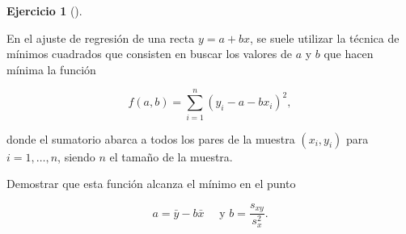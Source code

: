 \documentclass[
  a4paper,
]{scrreport}
\theoremstyle{definition}
\newtheorem{exercise}{Ejercicio}[chapter]
\theoremstyle{remark}
\begin{document}
\begin{exercise}[]\protect\hypertarget{exr-ajuste-minimos-cuadrados}{}\label{exr-ajuste-minimos-cuadrados}

En el ajuste de regresión de una recta \(y=a+bx\), se suele utilizar la
técnica de mínimos cuadrados que consisten en buscar los valores de
\(a\) y \(b\) que hacen mínima la función

\[
f(a,b)= \sum_{i=1}^{n}(y_i-a-bx_i)^2,
\]

donde el sumatorio abarca a todos los pares de la muestra \((x_i,y_i)\)
para \(i=1,\ldots, n\), siendo \(n\) el tamaño de la muestra.

Demostrar que esta función alcanza el mínimo en el punto

\[
a=\bar y-b\bar x \quad \mbox{ y } b=\frac{s_{xy}}{s_x^2}.
\]

\end{exercise}
\end{document}
